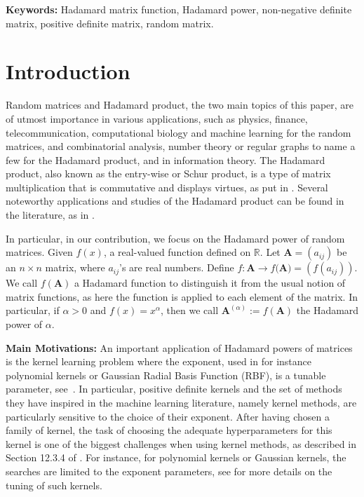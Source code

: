 \documentclass[conference,letterpaper]{IEEEtran}
\numberwithin{equation}{section}
\begin{document}
\noindent\textbf{Keywords:} Hadamard matrix function, Hadamard power, non-negative definite matrix, positive definite matrix, random matrix.

%


\section{Introduction}
Random matrices and Hadamard product, the two main topics of this paper, are of utmost importance in various applications, such as physics, finance, telecommunication, computational biology and machine learning for the random matrices, and combinatorial analysis, number theory or regular graphs to name a few for the Hadamard product, and in information theory.
The Hadamard product, also known as the entry-wise or Schur product, is a type of matrix multiplication that is commutative and displays virtues, as put in \cite{horadam2012hadamard}. 
Several noteworthy applications and studies of the Hadamard product can be found in the literature, as in \cite{hedayat1978hadamard,agaian2006hadamard,bulutoglu2009counterexample,audenaert2010spectral}.

In particular, in our contribution, we focus on the Hadamard power of random matrices. 
Given $f(x)$, a real-valued function defined on $\mathbb{R}.$ Let $\mathbf{A}=(a_{ij})$ be an $n\times n$ matrix, where $a_{ij}$'s are real numbers.  Define $f: \mathbf{A} \rightarrow f(\mathbf{A)}=(f(a_{i j}))$. We call $f(\mathbf{A})$  a Hadamard function to distinguish it from the usual notion of matrix functions, as here the function is applied to each element of the matrix. 
In particular, if $\alpha>0$ and  $f(x)=x^{\alpha}$, then we call  $\mathbf{A}^{(\alpha)}:=f(\mathbf{A})$ the Hadamard power of $\alpha$. 

\textbf{Main Motivations: }
An important application of Hadamard powers of matrices is the kernel learning problem where the exponent, used in for instance polynomial kernels or Gaussian Radial Basis Function (RBF), is a tunable parameter, see~\cite{jiang2017hadamard,li2018several, belton2019simultaneous}.
In particular, positive definite kernels and the set of methods they have inspired in the machine learning literature, namely kernel methods, are particularly sensitive to the choice of their exponent.
After having chosen a family of kernel, the task of choosing the adequate hyperparameters for this kernel is one of the biggest challenges when using kernel methods, as described in Section 12.3.4 of \cite{hastie2009elements}. 
For instance, for polynomial kernels or Gaussian kernels, the searches are limited to the exponent parameters, see \cite{bousquet2002complexity,frohlich2004feature,keerthi2007efficient} for more details on the tuning of such kernels.
\end{document}
